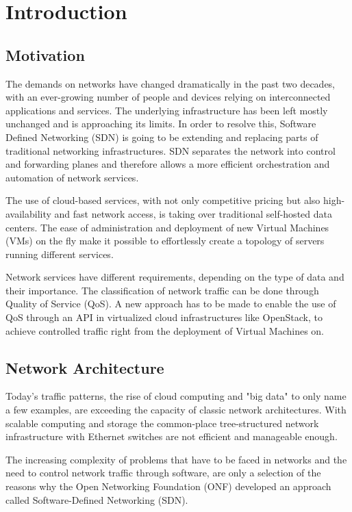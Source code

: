 \chapter{Introduction}
\label{chapter_introduction}



\section{Motivation}

The demands on networks have changed dramatically in the past two decades, with an ever-growing number of people and devices relying on interconnected applications and services. The underlying infrastructure has been left mostly unchanged and is approaching its limits. In order to resolve this, Software Defined Networking (SDN) is going to be extending and replacing parts of traditional networking infrastructures. SDN separates the network into control and forwarding planes and therefore allows a more efficient orchestration and automation of network services.

The use of cloud-based services, with not only competitive pricing but also high-availability and fast network access,  is taking over traditional self-hosted data centers. The ease of administration and deployment of new Virtual Machines (VMs) on the fly make it possible to effortlessly create a topology of servers running different services.

Network services have different requirements, depending on the type of data and their importance. The classification of network traffic can be done through Quality of Service (QoS). A new approach has to be made to enable the use of QoS through an API in virtualized cloud infrastructures like OpenStack, to achieve controlled traffic right from the deployment of Virtual Machines on.


\section{Network Architecture}
Today's traffic patterns, the rise of cloud computing and "big data" to only name a few examples, are exceeding the capacity of classic network architectures. With scalable computing and storage the common-place tree-structured network infrastructure with Ethernet switches are not efficient and manageable enough. 

The increasing complexity of problems that have to be faced in networks and the need to control network traffic through software, are only a selection of the reasons why the Open Networking Foundation (ONF) developed an approach called Software-Defined Networking (SDN).

